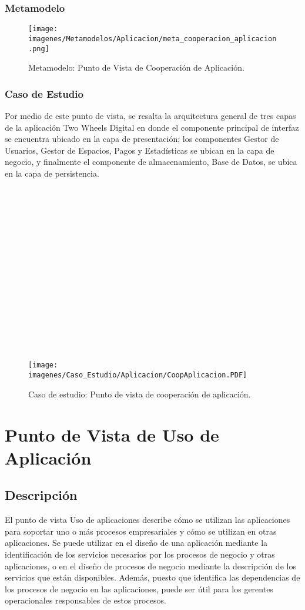 \subsubsection{Metamodelo}
\begin{figure}[h]
	\centering
	\texttt{[image: imagenes/Metamodelos/Aplicacion/meta\_cooperacion\_aplicacion.png]}
	\caption{Metamodelo: Punto de Vista de Cooperación de Aplicación.}
	\label{fig:gap_analysis}
\end{figure}

\subsubsection{Caso de Estudio}
Por medio de este punto de vista, se resalta la arquitectura general de tres capas de la aplicación Two Wheels Digital en donde el componente principal de interfaz se encuentra ubicado en la capa de presentación; los componentes Gestor de Usuarios, Gestor de Espacios, Pagos y Estadísticas se ubican en la capa de negocio, y finalmente el componente de almacenamiento, Base de Datos, se ubica en la capa de persistencia.\\
\\
\\
\\
\\
\\
\\
\\
\\
\\
\\
\\
\\
\\
\\
\\

\begin{figure}[h]
	\centering
	\texttt{[image: imagenes/Caso\_Estudio/Aplicacion/CoopAplicacion.PDF]}
	\caption{Caso de estudio: Punto de vista de cooperación de aplicación.}
	\label{fig:gap_analysis}
\end{figure}






\section{Punto de Vista de Uso de Aplicación}
\subsection{Descripción}
El punto de vista Uso de aplicaciones describe cómo se utilizan las aplicaciones para soportar uno o más procesos empresariales y cómo se utilizan en otras aplicaciones. Se puede utilizar en el diseño de una aplicación mediante la identificación de los servicios necesarios por los procesos de negocio y otras aplicaciones, o en el diseño de procesos de negocio mediante la descripción de los servicios que están disponibles. Además, puesto que identifica las dependencias de los procesos de negocio en las aplicaciones, puede ser útil para los gerentes operacionales responsables de estos procesos.

